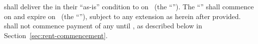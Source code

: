 \lessor shall deliver the \premises in their ``as-is'' condition to \lessee on \deliveryDateText\ (the ``\deliveryDate''). The ``\termOfLease'' shall commence on \deliveryDate and expire on \expirationDateText\ (the ``''), subject to any extension as herein after provided. \lessee shall not commence payment of any \baseMonthlyRent until \rentCommencementDate, as described below in Section~\ref{sec:rent-commencement}.
